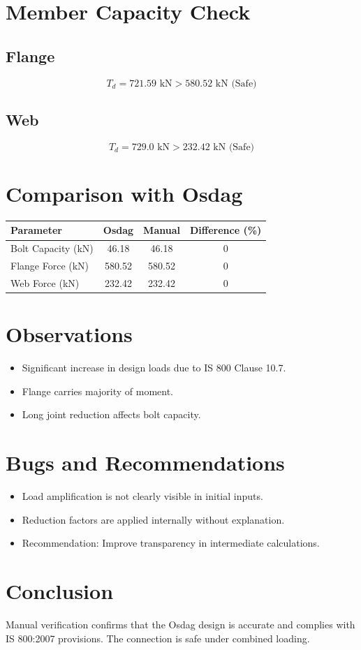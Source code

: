 \section{Member Capacity Check}

\subsection{Flange}
\begin{equation}
T_d = 721.59 \text{ kN} > 580.52 \text{ kN (Safe)}
\end{equation}

\subsection{Web}
\begin{equation}
T_d = 729.0 \text{ kN} > 232.42 \text{ kN (Safe)}
\end{equation}

\section{Comparison with Osdag}

\begin{center}
\begin{tabular}{lccc}
\toprule
Parameter & Osdag & Manual & Difference (\%) \\
\midrule
Bolt Capacity (kN) & 46.18 & 46.18 & 0 \\
Flange Force (kN) & 580.52 & 580.52 & 0 \\
Web Force (kN) & 232.42 & 232.42 & 0 \\
\bottomrule
\end{tabular}
\end{center}

\section{Observations}
\begin{itemize}
    \item Significant increase in design loads due to IS 800 Clause 10.7.
    \item Flange carries majority of moment.
    \item Long joint reduction affects bolt capacity.
\end{itemize}

\section{Bugs and Recommendations}
\begin{itemize}
    \item Load amplification is not clearly visible in initial inputs.
    \item Reduction factors are applied internally without explanation.
    \item Recommendation: Improve transparency in intermediate calculations.
\end{itemize}

\section{Conclusion}
Manual verification confirms that the Osdag design is accurate and complies with IS 800:2007 provisions. The connection is safe under combined loading.

